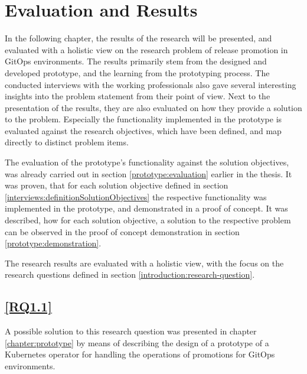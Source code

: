 \chapter{Evaluation and Results}
\label{evaluation-and-results}

In the following chapter,
the results of the research will be presented,
and evaluated with a holistic view on the research problem of release promotion in GitOps environments.
The results primarily stem from the designed and developed prototype,
and the learning from the prototyping process.
The conducted interviews with the working professionals also gave several interesting insights into
the problem statement from their point of view.
Next to the presentation of the results, they are also evaluated on how they provide a solution
to the problem.
Especially the functionality implemented in the prototype is evaluated against the research objectives,
which have been defined, and map directly to distinct problem items.

The evaluation of the prototype's functionality against the solution objectives,
was already carried out in section \ref{prototype:evaluation} earlier in the thesis.
It was proven, that for each solution objective defined in section \ref{interviews:definitionSolutionObjectives}
the respective functionality was implemented in the prototype,
and demonstrated in a proof of concept.
It was described, how for each solution objective,
a solution to the respective problem can be observed in the
proof of concept demonstration in section \ref{prototype:demonstration}.



The research results are evaluated with a holistic view,
with the focus on the research questions defined in section \ref{introduction:research-question}.

\section*{\ref{RQ1.1}}

A possible solution to this research question was presented in chapter
\ref{chapter:prototype}
by means of describing the design of a prototype
of a Kubernetes operator for handling the operations of promotions for GitOps environments.

